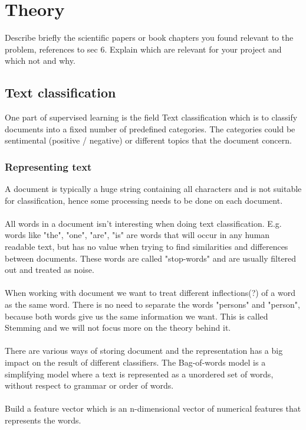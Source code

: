 \section{Theory}
Describe briefly the scientific papers or book chapters you found relevant to the problem, references to sec 6. Explain which are relevant for your project and which not and why.
\subsection{Text classification}
One part of supervised learning is the field Text classification which is to classify documents into a fixed number of predefined categories. The categories could be sentimental (positive / negative) or different topics that the document concern. 

\subsubsection{Representing text}
A document is typically a huge string containing all characters and is not suitable for classification, hence some processing needs to be done on each document. 
\\\\
All words in a document isn't interesting when doing text classification. E.g. words like "the", "one", "are", "is" are words that will occur in any human readable text, but has no value when trying to find similarities and differences between documents. These words are called "stop-words" and are usually filtered out and treated as noise. 
\\\\
When working with document we want to treat different inflections(?) of a word as the same word. There is no need to separate the words "persons" and "person", because both words give us the same information we want. This is called Stemming and we will not focus more on the theory behind it.
\\\\
There are various ways of storing document and the representation has a big impact on the result of different classifiers. The Bag-of-words model is a simplifying model where a text is represented as a unordered set of words, without respect to grammar or order of words. 
\\\\
Build a feature vector which is an n-dimensional vector of numerical features that represents the words.
